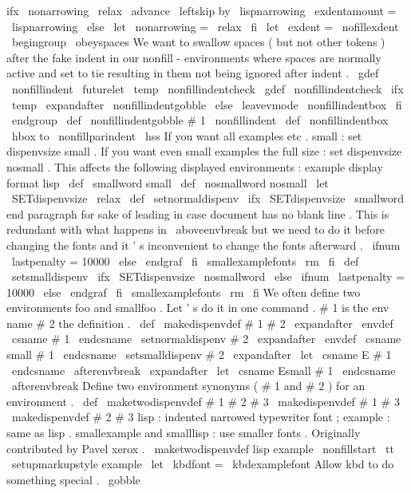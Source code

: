 {{{{ifx
\
nonarrowing
\
relax
\
advance
\
leftskip
by
\
lispnarrowing
\
exdentamount
=
\
lispnarrowing
\
else
\
let
\
nonarrowing
=
\
relax
\
fi
\
let
\
exdent
=
\
nofillexdent
}
\
begingroup
\
obeyspaces
%
We
want
to
swallow
spaces
(
but
not
other
tokens
)
after
the
fake
%
indent
in
our
nonfill
-
environments
where
spaces
are
normally
%
active
and
set
to
tie
resulting
in
them
not
being
ignored
after
%
indent
.
\
gdef
\
nonfillindent
{
\
futurelet
\
temp
\
nonfillindentcheck
}
%
\
gdef
\
nonfillindentcheck
{
%
\
ifx
\
temp
%
\
expandafter
\
nonfillindentgobble
%
\
else
%
\
leavevmode
\
nonfillindentbox
%
\
fi
%
}
%
\
endgroup
\
def
\
nonfillindentgobble
#
1
{
\
nonfillindent
}
\
def
\
nonfillindentbox
{
\
hbox
to
\
nonfillparindent
{
\
hss
}
}
%
If
you
want
all
examples
etc
.
small
:
set
dispenvsize
small
.
%
If
you
want
even
small
examples
the
full
size
:
set
dispenvsize
nosmall
.
%
This
affects
the
following
displayed
environments
:
%
example
display
format
lisp
%
\
def
\
smallword
{
small
}
\
def
\
nosmallword
{
nosmall
}
\
let
\
SETdispenvsize
\
relax
\
def
\
setnormaldispenv
{
%
\
ifx
\
SETdispenvsize
\
smallword
%
end
paragraph
for
sake
of
leading
in
case
document
has
no
blank
%
line
.
This
is
redundant
with
what
happens
in
\
aboveenvbreak
but
%
we
need
to
do
it
before
changing
the
fonts
and
it
'
s
inconvenient
%
to
change
the
fonts
afterward
.
\
ifnum
\
lastpenalty
=
10000
\
else
\
endgraf
\
fi
\
smallexamplefonts
\
rm
\
fi
}
\
def
\
setsmalldispenv
{
%
\
ifx
\
SETdispenvsize
\
nosmallword
\
else
\
ifnum
\
lastpenalty
=
10000
\
else
\
endgraf
\
fi
\
smallexamplefonts
\
rm
\
fi
}
%
We
often
define
two
environments
foo
and
smallfoo
.
%
Let
'
s
do
it
in
one
command
.
#
1
is
the
env
name
#
2
the
definition
.
\
def
\
makedispenvdef
#
1
#
2
{
%
\
expandafter
\
envdef
\
csname
#
1
\
endcsname
{
\
setnormaldispenv
#
2
}
%
\
expandafter
\
envdef
\
csname
small
#
1
\
endcsname
{
\
setsmalldispenv
#
2
}
%
\
expandafter
\
let
\
csname
E
#
1
\
endcsname
\
afterenvbreak
\
expandafter
\
let
\
csname
Esmall
#
1
\
endcsname
\
afterenvbreak
}
%
Define
two
environment
synonyms
(
#
1
and
#
2
)
for
an
environment
.
\
def
\
maketwodispenvdef
#
1
#
2
#
3
{
%
\
makedispenvdef
{
#
1
}
{
#
3
}
%
\
makedispenvdef
{
#
2
}
{
#
3
}
%
}
%
%
lisp
:
indented
narrowed
typewriter
font
;
%
example
:
same
as
lisp
.
%
%
smallexample
and
smalllisp
:
use
smaller
fonts
.
%
Originally
contributed
by
Pavel
xerox
.
%
\
maketwodispenvdef
{
lisp
}
{
example
}
{
%
\
nonfillstart
\
tt
\
setupmarkupstyle
{
example
}
%
\
let
\
kbdfont
=
\
kbdexamplefont
%
Allow
kbd
to
do
something
special
.
\
gobble
}}}}
